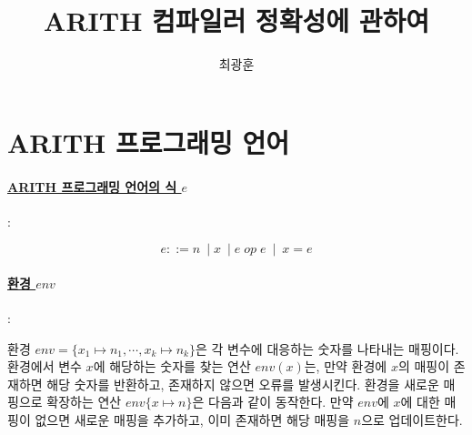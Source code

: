 \documentclass[runningheads]{llncs}
\begin{document}
%
\title{ARITH 컴파일러 정확성에 관하여}
%
%
\author{최광훈}
%
%
%
\maketitle              %
%


%
%
%
\section{ARITH 프로그래밍 언어}

\paragraph{\underline{ARITH 프로그래밍 언어의 식 $e$}}:

\[
e ::= n \ \mid x \ \mid e \; op \; e \ \mid \  x = e
\]

\paragraph{\underline{환경 $env$}}:

환경 $env = \{ x_1\mapsto n_1, \cdots, x_k\mapsto n_k \} $은 각 변수에 대응하는 숫자를 나타내는 매핑이다.
환경에서 변수 $x$에 해당하는 숫자를 찾는 연산 $env(x)$는, 만약 환경에 $x$의 매핑이 존재하면 해당 숫자를 반환하고, 
존재하지 않으면 오류를 발생시킨다. 
%
환경을 새로운 매핑으로 확장하는 연산 $env\{x\mapsto n\}$은 다음과 같이 동작한다. 만약 $env$에 $x$에 대한 매핑이 
없으면 새로운 매핑을 추가하고, 이미 존재하면 해당 매핑을 $n$으로 업데이트한다. 
\end{document}
